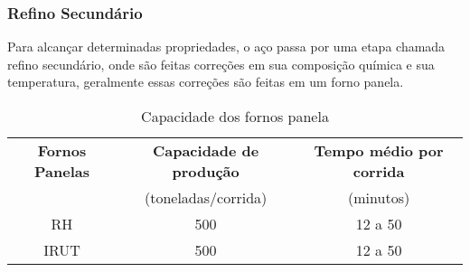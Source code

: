 \subsubsection{Refino Secundário}
Para alcançar determinadas propriedades, o aço passa por uma etapa chamada refino secundário, onde são feitas correções em sua composição química e sua temperatura, geralmente essas correções são feitas em um forno panela.


\begin{table}[H]
\begin{center}
  \begin{tabular}{|c|c|c|}
    \hline
    {\bf Fornos Panelas} & {\bf Capacidade de produção} & {\bf Tempo médio por corrida} \\
    $\quad$ & (toneladas/corrida)        &    (minutos) \\ \hline
    RH & 500 & 12 a 50 \\ \hline
   IRUT & 500 & 12 a 50 \\ \hline
    
  \end{tabular}
\end{center}
\caption{Capacidade dos fornos panela}
\end{table}






